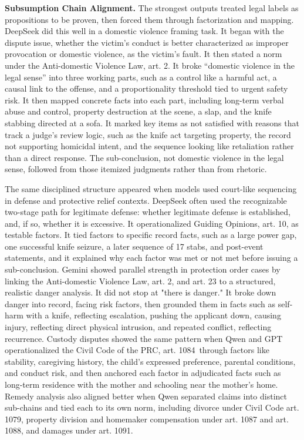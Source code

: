 \documentclass[pdflatex,sn-mathphys-ay]{sn-jnl}%
\theoremstyle{thmstyleone}%
\theoremstyle{thmstyletwo}%
\theoremstyle{thmstylethree}%
\begin{document}
\textbf{Subsumption Chain Alignment.} The strongest outputs treated legal labels as propositions to be proven, then forced them through factorization and mapping. DeepSeek did this well in a domestic violence framing task. It began with the dispute issue, whether the victim's conduct is better characterized as improper provocation or domestic violence, as the victim's fault. It then stated a norm under the Anti-domestic Violence Law, art. 2. It broke ``domestic violence in the legal sense'' into three working parts, such as a control like a harmful act, a causal link to the offense, and a proportionality threshold tied to urgent safety risk. It then mapped concrete facts into each part, including long-term verbal abuse and control, property destruction at the scene, a slap, and the knife stabbing directed at a sofa. It marked key items as not satisfied with reasons that track a judge's review logic, such as the knife act targeting property, the record not supporting homicidal intent, and the sequence looking like retaliation rather than a direct response. The sub-conclusion, not domestic violence in the legal sense, followed from those itemized judgments rather than from rhetoric.

The same disciplined structure appeared when models used court-like sequencing in defense and protective relief contexts. DeepSeek often used the recognizable two-stage path for legitimate defense: whether legitimate defense is established, and, if so, whether it is excessive. It operationalized Guiding Opinions, art. 10, as testable factors. It tied factors to specific record facts, such as a large power gap, one successful knife seizure, a later sequence of 17 stabs, and post-event statements, and it explained why each factor was met or not met before issuing a sub-conclusion. Gemini showed parallel strength in protection order cases by linking the Anti-domestic Violence Law, art. 2, and art. 23 to a structured, realistic danger analysis. It did not stop at "there is danger." It broke down danger into record, facing risk factors, then grounded them in facts such as self-harm with a knife, reflecting escalation, pushing the applicant down, causing injury, reflecting direct physical intrusion, and repeated conflict, reflecting recurrence. Custody disputes showed the same pattern when Qwen and GPT operationalized the Civil Code of the PRC, art. 1084~through factors like stability, caregiving history, the child's expressed preference, parental conditions, and conduct risk, and then anchored each factor in adjudicated facts such as long-term residence with the mother and schooling near the mother's home. Remedy analysis also aligned better when Qwen separated claims into distinct sub-chains and tied each to its own norm, including divorce under Civil Code art. 1079, property division and homemaker compensation under art. 1087 and art. 1088, and damages under art. 1091.
\end{document}
